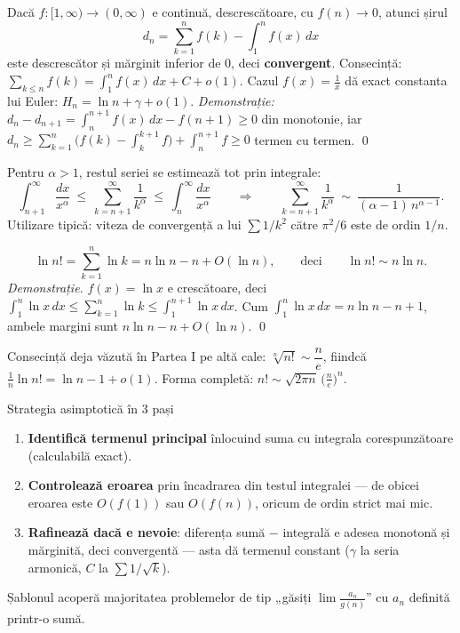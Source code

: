 \begin{teorema}
Dacă $f:[1,\infty)\to(0,\infty)$ e continuă, descrescătoare, cu $f(n)\to0$, atunci șirul
\[
d_n=\sum_{k=1}^{n}f(k)-\int_1^{n}f(x)\,dx
\]
este descrescător și mărginit inferior de $0$, deci \textbf{convergent}. Consecință: $\sum_{k\le n}f(k)=\int_1^n f(x)\,dx+C+o(1)$.
Cazul $f(x)=\frac1x$ dă exact constanta lui Euler: $H_n=\ln n+\gamma+o(1)$.
\emph{Demonstrație:} $d_n-d_{n+1}=\int_n^{n+1}f(x)\,dx-f(n+1)\ge0$ din monotonie, iar $d_n\ge\sum_{k=1}^{n}\big(f(k)-\int_k^{k+1}f\big)+\int_n^{n+1}f\ge 0$ termen cu termen. \qed
\end{teorema}

\begin{teorema}
Pentru $\alpha>1$, restul seriei se estimează tot prin integrale:
\[
\int_{n+1}^{\infty}\frac{dx}{x^{\alpha}}\ \le\ \sum_{k=n+1}^{\infty}\frac{1}{k^{\alpha}}\ \le\ \int_{n}^{\infty}\frac{dx}{x^{\alpha}}
\qquad\Longrightarrow\qquad
\sum_{k=n+1}^{\infty}\frac{1}{k^{\alpha}}\ \sim\ \frac{1}{(\alpha-1)\,n^{\alpha-1}}.
\]
Utilizare tipică: viteza de convergență a lui $\sum1/k^2$ către $\pi^2/6$ este de ordin $1/n$.
\end{teorema}

\begin{teorema}
\[
\ln n!=\sum_{k=1}^{n}\ln k=n\ln n-n+O(\ln n),
\qquad\text{deci}\qquad
\ln n!\sim n\ln n.
\]
\emph{Demonstrație.} $f(x)=\ln x$ e crescătoare, deci $\int_1^n\ln x\,dx\le\sum_{k=1}^n\ln k\le\int_1^{n+1}\ln x\,dx$. Cum $\int_1^n\ln x\,dx=n\ln n-n+1$, ambele margini sunt $n\ln n-n+O(\ln n)$. \qed

Consecință deja văzută în Partea I pe altă cale: $\sqrt[n]{n!}\sim\dfrac{n}{e}$, fiindcă $\frac1n\ln n!=\ln n-1+o(1)$. Forma completă: $n!\sim\sqrt{2\pi n}\,\big(\frac ne\big)^n$.
\end{teorema}

\begin{tehbox}{Strategia asimptotică în 3 pași}
\begin{enumerate}[leftmargin=*, itemsep=1pt]
\item \textbf{Identifică termenul principal} înlocuind suma cu integrala corespunzătoare (calculabilă exact).
\item \textbf{Controlează eroarea} prin încadrarea din testul integralei --- de obicei eroarea este $O(f(1))$ sau $O(f(n))$, oricum de ordin strict mai mic.
\item \textbf{Rafinează dacă e nevoie}: diferența sumă $-$ integrală e adesea monotonă și mărginită, deci convergentă --- asta dă termenul constant ($\gamma$ la seria armonică, $C$ la $\sum1/\sqrt k$).
\end{enumerate}
Șablonul acoperă majoritatea problemelor de tip „găsiți $\lim\frac{a_n}{g(n)}$'' cu $a_n$ definită printr-o sumă.
\end{tehbox}

